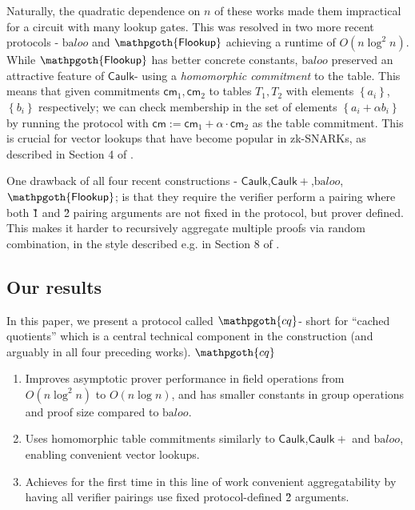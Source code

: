 \documentclass[11pt]{article} %
\newcommand{\cq}{\ensuremath{\mathpgoth{cq} }\xspace}
\newcommand{\flookup}{\ensuremath{\mathsf{\mathpgoth{Flookup}}}\xspace}
\newcommand{\baloo}{\ensuremath{\mathrm{ba}\mathit{loo}}\xspace}
\newcommand{\caulkp}{\ensuremath{\mathsf{\mathrel{Caulk}\mathrel{\scriptstyle{+}}}}\xspace}
\newcommand{\caulk}{\ensuremath{\mathsf{Caulk}}\xspace}
\newcommand{\cm}{\ensuremath{\mathsf{cm}}\xspace}
\newcommand{\defeq}{:=}
\newcommand{\set}[1]{\ensuremath{\left\{#1\right\}}\xspace}
\newcommand{\witsize}{\ensuremath{n}\xspace}
\begin{document}
Naturally, the quadratic dependence on \witsize  of these works made them impractical for a circuit with many lookup gates. This was resolved in two more recent protocols - \baloo\cite{baloo} and \flookup\cite{flookup} achieving a runtime of $O(\witsize\log^2\witsize)$.
While \flookup has better concrete constants, \baloo preserved an attractive feature of \caulk\space  - using a \emph{homomorphic commitment} to the table. This means that given commitments $\cm_1,\cm_2$ to tables $T_1,T_2$ with elements \set{a_i},\set{b_i} respectively;
we can check membership in the set of elements $\set{a_i+\alpha b_i}$ by running the protocol with $\cm\defeq \cm_1+\alpha\cdot \cm_2$ as the table commitment. This is crucial for vector lookups that have become popular in zk-SNARKs, as described in Section 4 of \cite{plookup}.

One drawback of all four recent constructions - \caulk,\caulkp,\baloo,\flookup; is that they require the verifier perform a pairing where both \G1 and \G2 pairing arguments are not fixed in the protocol, but prover defined. This makes it harder to recursively aggregate multiple proofs via random combination, in the style described e.g. in Section 8 of \cite{bcms}.

\subsection{Our results}

In this paper, we present a protocol called \cq\space  - short for ``cached quotients'' which is a central technical component in the construction (and arguably in all four preceding works). 
\cq
\begin{enumerate}
 \item Improves asymptotic prover performance in field operations from $O(\witsize\log^2\witsize)$ to $O(\witsize\log\witsize)$, and has smaller constants in group operations and proof size compared to \baloo.

 \item Uses homomorphic table commitments similarly to \caulk,\caulkp and \baloo, enabling convenient vector lookups.
 \item Achieves for the first time in this line of work convenient aggregatability by having all verifier pairings use fixed protocol-defined \G2 arguments.
\end{enumerate}
\end{document}
